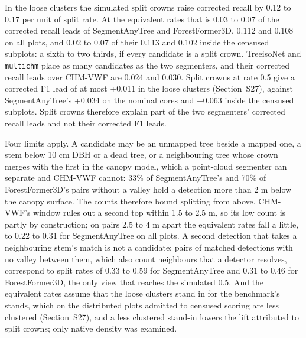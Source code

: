 \documentclass[10pt,a4paper]{article}
\begin{document}
In the loose clusters the simulated split crowns raise corrected recall by 0.12
to 0.17 per unit of split rate. At the equivalent rates that is 0.03 to 0.07 of
the corrected recall leads of SegmentAnyTree and ForestFormer3D, 0.112 and
0.108 on all plots, and 0.02 to 0.07 of their 0.113 and 0.102 inside the
censused subplots: a sixth to two thirds, if every candidate is a split crown.
TreeisoNet and \texttt{multichm} place as many candidates as the two segmenters, and
their corrected recall leads over CHM-VWF are 0.024 and 0.030. Split crowns at
rate 0.5 give a corrected F1 lead of at most +0.011 in the loose clusters
(Section~S27), against SegmentAnyTree's +0.034 on the nominal cores and +0.063
inside the censused subplots. Split crowns therefore explain part of the two
segmenters' corrected recall leads and not their corrected F1 leads.

Four limits apply. A candidate may be an unmapped tree beside a mapped one, a
stem below 10 cm DBH or a dead tree, or a neighbouring tree whose crown merges
with the first in the canopy model, which a point-cloud segmenter can separate
and CHM-VWF cannot: 33\% of SegmentAnyTree's and 70\% of ForestFormer3D's pairs
without a valley hold a detection more than 2 m below the canopy surface. The
counts therefore bound splitting from above. CHM-VWF's window rules out a
second top within 1.5 to 2.5 m, so its low count is partly by construction; on
pairs 2.5 to 4 m apart the equivalent rates fall a little, to 0.22 to 0.31 for
SegmentAnyTree on all plots. A second detection that takes a neighbouring
stem's match is not a candidate; pairs of matched detections with no valley
between them, which also count neighbours that a detector resolves, correspond
to split rates of 0.33 to 0.59 for SegmentAnyTree and 0.31 to 0.46 for
ForestFormer3D, the only view that reaches the simulated 0.5. And the equivalent
rates assume that the loose clusters stand in for the benchmark's stands, which
on the distributed plots admitted to censused scoring are less clustered
(Section~S27), and a less clustered stand-in lowers the lift attributed to split
crowns; only native density was examined.
\end{document}
